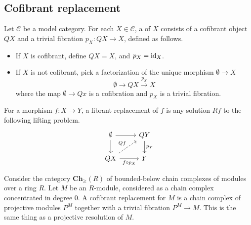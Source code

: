 \documentclass[main.tex]{subfiles}
\begin{document}
\subsection{Cofibrant replacement}
\label{ssc:cofibrant_replacement}

\begin{definition}
  \label{def:cofibrant_replacement}
  Let $\mathcal{C}$ be a model category. For each $X \in \mathcal{C}$, a  of $X$ consists of a cofibrant object $QX$ and a trivial fibration $p_{X}\colon QX \to X$, defined as follows.
  \begin{itemize}
    \item If $X$ is cofibrant, define $QX = X$, and $p_{X} = \mathrm{id}_{X}$.

    \item If $X$ is not cofibrant, pick a factorization of the unique morphism $\emptyset \to X$
      \begin{equation*}
        \emptyset \to QX \overset{p_{X}}{\to} X
      \end{equation*}
      where the map $\emptyset \to Qx$ is a cofibration and $p_{X}$ is a trivial fibration.
  \end{itemize}

  For a morphism $f\colon X \to Y$, a fibrant replacement of $f$ is any solution $Rf$ to the following lifting problem.
  \begin{equation*}
    \begin{tikzcd}
      \emptyset
      \arrow[r]
      \arrow[d]
      & QY
      \arrow[d, "p_{Y}"]
      \\
      QX
      \arrow[r, swap, "f \circ p_{X}"]
      \arrow[ur, dashed, "Qf"]
      & Y
    \end{tikzcd}
  \end{equation*}
\end{definition}

\begin{example}
  Consider the category $\mathbf{Ch}_{\geq}(R)$ of bounded-below chain complexes of modules over a ring $R$. Let $M$ be an $R$-module, considered as a chain complex concentrated in degree 0. A cofibrant replacement for $M$ is a chain complex of projective modules $P^{M}$ together with a trivial fibration $P^{M} \to M$. This is the same thing as a projective resolution of $M$.
\end{example}
\end{document}
